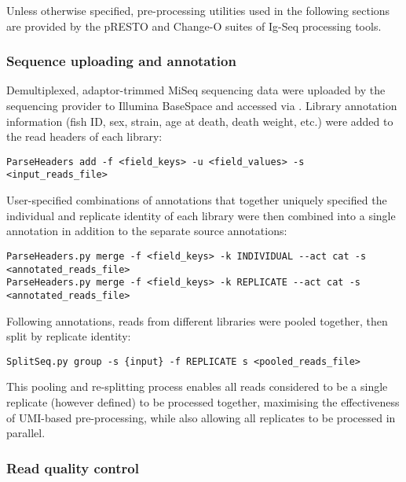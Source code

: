 {Unless otherwise specified, pre-processing utilities used in the following sections are provided by the pRESTO \parencite{vanderheiden2014presto} and Change-O \parencite{gupta2015changeo} suites of Ig-Seq processing tools.

\subsubsection{Sequence uploading and annotation}
\label{sec:methods_comp_igpreproc_annot}

Demultiplexed, adaptor-trimmed MiSeq sequencing data were uploaded by the sequencing provider to Illumina BaseSpace and accessed via . Library annotation information (fish ID, sex, strain, age at death, death weight, etc.) were added to the read headers of each library:

\begin{lstlisting}
ParseHeaders add -f <field_keys> -u <field_values> -s <input_reads_file>
\end{lstlisting}

User-specified combinations of annotations that together uniquely specified the individual and replicate identity of each library were then combined into a single annotation in addition to the separate source annotations:

\begin{lstlisting}
ParseHeaders.py merge -f <field_keys> -k INDIVIDUAL --act cat -s <annotated_reads_file>
ParseHeaders.py merge -f <field_keys> -k REPLICATE --act cat -s <annotated_reads_file>
\end{lstlisting}

Following annotations, reads from different libraries were pooled together, then split by replicate identity:

\begin{lstlisting}
SplitSeq.py group -s {input} -f REPLICATE s <pooled_reads_file>
\end{lstlisting}

This pooling and re-splitting process enables all reads considered to be a single replicate (however defined) to be processed together, maximising the effectiveness of UMI-based pre-processing, while also allowing all replicates to be processed in parallel. %

\subsubsection{Read quality control}
\label{sec:methods_comp_igpreproc_filter}


}
